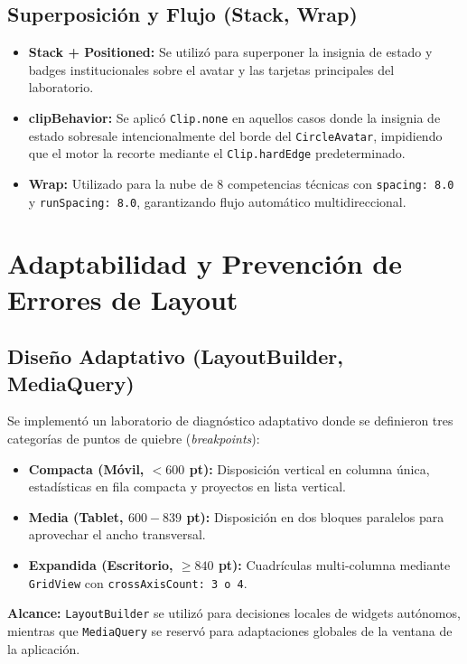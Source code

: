 \documentclass[12pt,a4paper]{article}
\begin{document}
\subsection{Superposición y Flujo (Stack, Wrap)}
\begin{itemize}[leftmargin=*]
    \item \textbf{Stack + Positioned:} Se utilizó para superponer la insignia de estado y badges institucionales sobre el avatar y las tarjetas principales del laboratorio.
    \item \textbf{clipBehavior:} Se aplicó \texttt{Clip.none} en aquellos casos donde la insignia de estado sobresale intencionalmente del borde del \texttt{CircleAvatar}, impidiendo que el motor la recorte mediante el \texttt{Clip.hardEdge} predeterminado.
    \item \textbf{Wrap:} Utilizado para la nube de 8 competencias técnicas con \texttt{spacing: 8.0} y \texttt{runSpacing: 8.0}, garantizando flujo automático multidireccional.
\end{itemize}

\section{Adaptabilidad y Prevención de Errores de Layout}

\subsection{Diseño Adaptativo (LayoutBuilder, MediaQuery)}
Se implementó un laboratorio de diagnóstico adaptativo donde se definieron tres categorías de puntos de quiebre (\textit{breakpoints}):
\begin{itemize}[leftmargin=*]
    \item \textbf{Compacta (Móvil, $< 600$ pt):} Disposición vertical en columna única, estadísticas en fila compacta y proyectos en lista vertical.
    \item \textbf{Media (Tablet, $600 - 839$ pt):} Disposición en dos bloques paralelos para aprovechar el ancho transversal.
    \item \textbf{Expandida (Escritorio, $\ge 840$ pt):} Cuadrículas multi-columna mediante \texttt{GridView} con \texttt{crossAxisCount: 3 o 4}.
\end{itemize}
\textbf{Alcance:} \texttt{LayoutBuilder} se utilizó para decisiones locales de widgets autónomos, mientras que \texttt{MediaQuery} se reservó para adaptaciones globales de la ventana de la aplicación.
\end{document}
